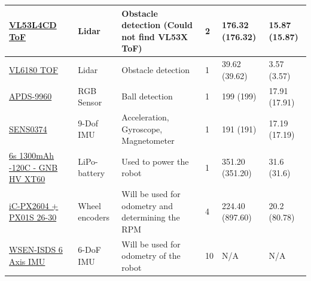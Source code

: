 \documentclass[a4paper,8pt]{article}
\begin{document}
\begin{center}
\begin{longtable}{|p{3cm}|p{3cm}|p{3cm}|p{1cm}|p{3cm}|p{3cm}|}
		\href{https://learn.adafruit.com/adafruit-vl53l4cd-time-of-flight-distance-sensor?view=all}{VL53L4CD ToF}                       & Lidar                                                                             & Obstacle detection (Could not find VL53X ToF)                                                                              & 2  & 176.32 (176.32) & 15.87 (15.87) \\ \hline
		\href{https://www.electrokit.com/upload/product/41013/41013634/DM00112632.pdf}{VL6180 TOF}                                      & Lidar                                                                             & Obstacle detection                                                                                                         & 1  & 39.62 (39.62)   & 3.57 (3.57)   \\ \hline
		\href{https://docs.broadcom.com/doc/AV02-4191EN}{APDS-9960}                                                                     & RGB Sensor                                                                        & Ball detection                                                                                                             & 1  & 199 (199)       & 17.91 (17.91) \\ \hline
		\href{https://wiki.dfrobot.com/BNO055_Intelligent_9_Axis_Sensor_Module_SKU_SEN0374}{SENS0374}                                   & 9-Dof IMU                                                                         & Acceleration, Gyroscope, Magnetometer                                                                                      & 1  & 191 (191)       & 17.19 (17.19) \\ \hline
		\href{https://www.elefun.se/p/prod.aspx?v=65193}{6s 1300mAh -120C - GNB HV XT60}                                                & LiPo-battery                                                                      & Used to power the robot                                                                                                    & 1  & 351.20 (351.20) & 31.6 (31.6)   \\ \hline
		\href{https://www.ichaus.de/product/ic-px-series/#documents}{iC-PX2604 + PX01S 26-30}                                           & Wheel encoders                                                                    & Will be used for odometry and determining the RPM                                                                          & 4  & 224.40 (897.60) & 20.2 (80.78)  \\ \hline
		\href{https://www.we-online.com/components/products/datasheet/2536030320001.pdf}{WSEN-ISDS 6 Axis IMU}                          & 6-DoF IMU                                                                         & Will be used for odometry of the robot                                                                                     & 10 & N/A             & N/A           \\ \hline

\end{longtable}
\end{center}
\end{document}

